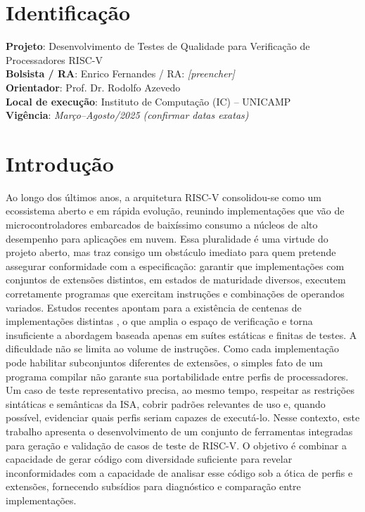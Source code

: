\documentclass[12pt,a4paper]{article}
\begin{document}
\section*{Identificação}
\textbf{Projeto}: Desenvolvimento de Testes de Qualidade para Verificação de Processadores RISC-V\\
\textbf{Bolsista / RA}: Enrico Fernandes / RA: \textit{[preencher]}\\
\textbf{Orientador}: Prof. Dr. Rodolfo Azevedo\\
\textbf{Local de execução}: Instituto de Computação (IC) – UNICAMP\\
\textbf{Vigência}: \textit{Março–Agosto/2025 (confirmar datas exatas)}

\section{Introdução}
Ao longo dos últimos anos, a arquitetura RISC-V consolidou-se como um ecossistema aberto e em rápida evolução, reunindo implementações que vão de microcontroladores embarcados de baixíssimo consumo a núcleos de alto desempenho para aplicações em nuvem. Essa pluralidade é uma virtude do projeto aberto, mas traz consigo um obstáculo imediato para quem pretende assegurar conformidade com a especificação: garantir que implementações com conjuntos de extensões distintos, em estados de maturidade diversos, executem corretamente programas que exercitam instruções e combinações de operandos variados. Estudos recentes apontam para a existência de centenas de implementações distintas \cite{waterman2019,cui2023}, o que amplia o espaço de verificação e torna insuficiente a abordagem baseada apenas em suítes estáticas e finitas de testes.
\newline
\noindent A dificuldade não se limita ao volume de instruções. Como cada implementação pode habilitar subconjuntos diferentes de extensões, o simples fato de um programa compilar não garante sua portabilidade entre perfis de processadores. Um caso de teste representativo precisa, ao mesmo tempo, respeitar as restrições sintáticas e semânticas da ISA, cobrir padrões relevantes de uso e, quando possível, evidenciar quais perfis seriam capazes de executá-lo. Nesse contexto, este trabalho apresenta o desenvolvimento de um conjunto de ferramentas integradas para geração e validação de casos de teste de RISC-V. O objetivo é combinar a capacidade de gerar código com diversidade suficiente para revelar inconformidades com a capacidade de analisar esse código sob a ótica de perfis e extensões, fornecendo subsídios para diagnóstico e comparação entre implementações.
\end{document}
